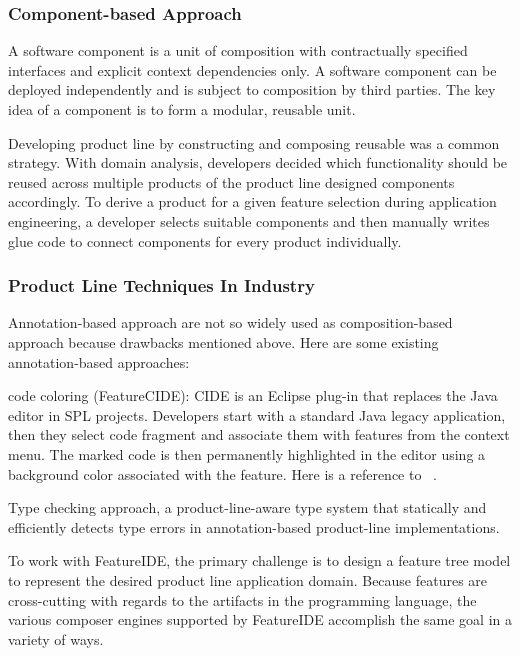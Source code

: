 \subsubsection{Component-based Approach}

A software component is a unit of composition with contractually specified interfaces and explicit context
dependencies only. A software component can be deployed independently and is subject to composition by third
parties. The key idea of a component is to form a modular, reusable unit.

Developing product line by constructing and composing reusable was a common strategy. With domain analysis,
developers decided which functionality should be reused across multiple products of the product line designed
components accordingly. To derive a product for a given feature selection during application engineering, a
developer selects suitable components and then manually writes glue code to connect components for every
product individually.




\subsubsection{Product Line Techniques In Industry}

Annotation-based approach are not so widely used as composition-based approach because drawbacks mentioned above.
Here are some existing annotation-based approaches:

code coloring (FeatureCIDE): CIDE is an Eclipse plug-in that replaces the Java editor in SPL projects. Developers
start with a standard Java legacy application, then they select code fragment and associate them with features
 from the context menu. The marked code is then permanently highlighted in the editor using a background color
 associated with the feature. Here is a reference to ~\cite{CIDE:Eclipse}.


Type checking approach,  a product-line-aware type system that statically and efficiently detects type errors in
annotation-based product-line implementations.~\cite{Kastner:2012}


To work with FeatureIDE, the primary challenge is to design a feature tree model to represent the desired product
line application domain. Because features are cross-cutting with regards to the artifacts in the programming
language, the various composer engines supported by FeatureIDE accomplish the same goal in a variety of ways.

